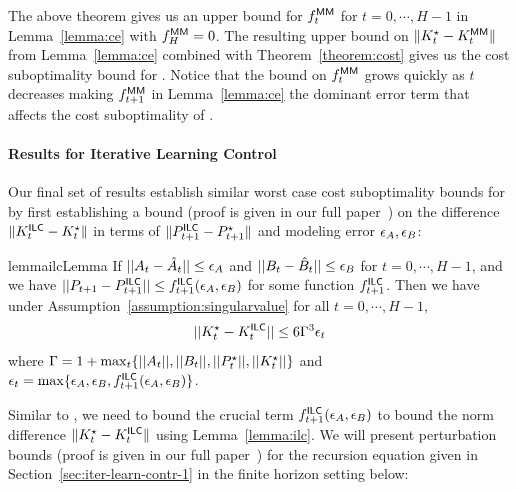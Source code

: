 The above theorem gives us an upper bound for $f^\mathsf{MM}_{t}$ for $t=0,
\cdots, H-1$ in
Lemma~\ref{lemma:ce} with $f^\mathsf{MM}_H = 0$. The resulting upper bound on $\|K^\star_t -
K^\mathsf{MM}_t\|$ from Lemma~\ref{lemma:ce} combined with
Theorem~\ref{theorem:cost} gives us the cost 
suboptimality bound for \MM{}. Notice that the
bound on $f^\mathsf{MM}_t$ grows quickly as $t$ decreases making $f^\mathsf{MM}_{t+1}$
in Lemma~\ref{lemma:ce} the dominant error term that affects the cost
suboptimality of \MM{}.

\paragraph{Results for Iterative Learning Control}
\label{sec:iter-learn-contr-3}

Our final set of results establish similar worst case cost
suboptimality bounds for \ILC{} by first establishing a bound (proof
is given in our full paper~\cite{DBLP:journals/corr/abs-2111-09434}) on the
difference $\|K^\mathsf{ILC}_t - K^\star_t\|$ in terms of $\|P^\mathsf{ILC}_{t+1} -
P^\star_{t+1}\|$ and modeling error $\epsilon_A, \epsilon_B$:
\begin{restatable}{lemma}{ilcLemma}
  \label{lemma:ilc}
  If $||A_{t} - \hat{A}_{t}|| \leq \epsilon_A$ and
  $||B_{t} - \hat{B}_{t}|| \leq \epsilon_B$ for $t=0, \cdots, H-1$, and we have
  $||P_{t+1} - P^\mathsf{ILC}_{t+1}|| \leq f^\mathsf{ILC}_{t+1}(\epsilon_A, \epsilon_B)$ for some function
  $f^\mathsf{ILC}_{t+1}$. Then we have under
  Assumption~\ref{assumption:singularvalue} for all $t=0, \cdots, H-1$,
  \begin{align}
    ||K^\star_{t} - K^\mathsf{ILC}_{t}|| \leq 6\Gamma^3\epsilon_t
    \label{eq:ilc-k-diff}
  \end{align}
  where
  $\Gamma = 1 + \max_{t}\{||A_{t}||, ||B_{t}||, ||P^\star_{t}||, ||K^\star_{t}||\}$
  and $\epsilon_{t} = \max\{\epsilon_A, \epsilon_B, f^\mathsf{ILC}_{t+1}(\epsilon_A,
  \epsilon_B)\}$. 
\end{restatable}
Similar to \MM{}, we need to bound the crucial term
$f^\mathsf{ILC}_{t+1}(\epsilon_A, \epsilon_B)$ to bound the norm difference $\|K^\star_t -
K^\mathsf{ILC}_t\|$ using Lemma~\ref{lemma:ilc}. We will present perturbation
bounds (proof is given in our full paper~\cite{DBLP:journals/corr/abs-2111-09434}) for the \ILC{}
recursion equation given in 
Section~\ref{sec:iter-learn-contr-1} in the finite horizon setting
below:
